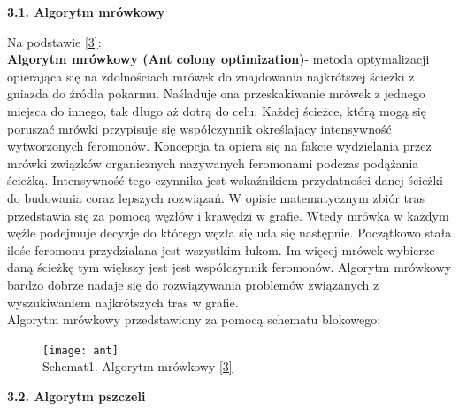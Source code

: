 \documentclass[a4paper, twoside, 12pt, justified]{article}
\begin{document}
	\newpage
	
	\begin{flushleft}
		\begin{large}
			\textbf{3.1. Algorytm mrówkowy}
		\end{large}
	\end{flushleft}
	\vspace{5mm} %

	Na podstawie \hyperlink{ant}{[3]}:\\
	\textbf{Algorytm mrówkowy (Ant colony optimization)}- metoda optymalizacji opierająca się na zdolnościach mrówek do znajdowania najkrótszej ścieżki z gniazda do źródła pokarmu. Naśladuje ona przeskakiwanie mrówek z jednego miejsca do innego, tak długo aż dotrą do celu. Każdej ścieżce, którą mogą się poruszać mrówki przypisuje się współczynnik określający intensywność wytworzonych feromonów. Koncepcja ta opiera się na fakcie wydzielania przez mrówki związków organicznych nazywanych feromonami podczas podążania ścieżką. Intensywność tego czynnika jest wskaźnikiem przydatności danej ścieżki do budowania coraz lepszych rozwiązań. W opisie matematycznym zbiór tras przedstawia się za pomocą węzłów i krawędzi w grafie. Wtedy mrówka w każdym węźle podejmuje decyzje do którego węzła się uda się następnie. Początkowo stała ilośc feromonu przydzialana jest wszystkim łukom. Im więcej mrówek wybierze daną ścieżkę tym większy jest jest współczynnik feromonów. Algorytm mrówkowy bardzo dobrze nadaje się do rozwiązywania problemów związanych z wyszukiwaniem najkrótszych tras w grafie.\\
	Algorytm mrówkowy przedstawiony za pomocą schematu blokowego:\\
	\begin{figure}[h]
		\texttt{[image: ant]}
		\centering
		\\
		{Schemat1. Algorytm mrówkowy \hyperlink{ant}{[3]} } 
	\end{figure}
	
	\newpage
	
	\begin{flushleft}
		\begin{large}
			\textbf{3.2. Algorytm pszczeli}
		\end{large}
	\end{flushleft}
	\vspace{5mm} %
	
\end{document}
